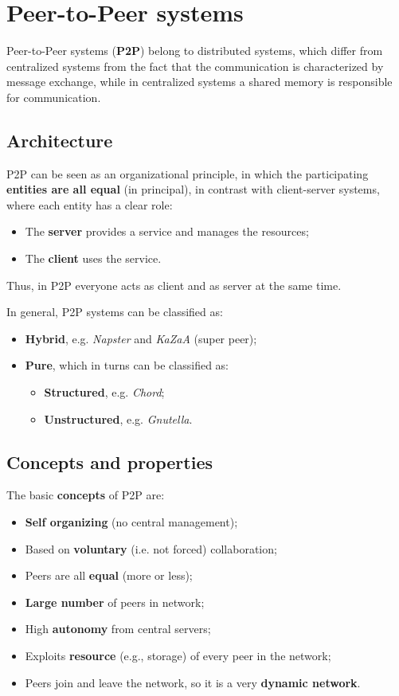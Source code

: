 \section{Peer-to-Peer systems }
Peer-to-Peer systems (\textbf{P2P}) belong to distributed systems, which differ from centralized systems from the fact that the communication is characterized by message exchange, while in centralized systems a shared memory is responsible for communication.

\subsection{Architecture}
P2P can be seen as an organizational principle, in which the participating \textbf{entities are all equal} (in principal), in contrast with client-server systems, where each entity has a clear role:
\begin{itemize}
    \item The \textbf{server} provides a service and manages the resources;
    \item The \textbf{client} uses the service.
\end{itemize}

Thus, in P2P everyone acts as client and as server at the same time.

In general, P2P systems can be classified as:
\begin{itemize}
    \item \textbf{Hybrid}, e.g. \textit{Napster} and \textit{KaZaA} (super peer);
    \item \textbf{Pure}, which in turns can be classified as:
    \begin{itemize}
        \item \textbf{Structured}, e.g. \textit{Chord};
        \item \textbf{Unstructured}, e.g. \textit{Gnutella}.
    \end{itemize}
\end{itemize}

\subsection{Concepts and properties}
The basic \textbf{concepts} of P2P are:
\begin{itemize}
    \item \textbf{Self organizing} (no central management);
    \item Based on \textbf{voluntary} (i.e. not forced) collaboration;
    \item Peers are all \textbf{equal} (more or less);
    \item \textbf{Large number} of peers in network;
    \item High \textbf{autonomy} from central servers;
    \item Exploits \textbf{resource} (e.g., storage) of every peer in the network;
    \item Peers join and leave the network, so it is a very \textbf{dynamic network}.
\end{itemize}

